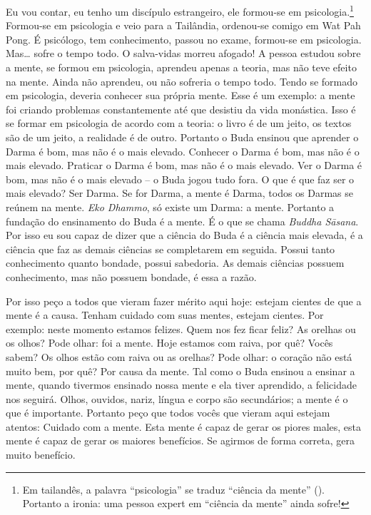 Eu vou contar, eu tenho um discípulo estrangeiro, ele formou-se em
psicologia.\footnote{Em tailandês, a palavra “psicologia” se traduz
“ciência da mente”
(). Portanto a
ironia: uma pessoa expert em “ciência da mente” ainda sofre!}
Formou-se em psicologia e veio para a Tailândia, ordenou-se comigo em
Wat Pah Pong. É psicólogo, tem conhecimento, passou no exame, formou-se
em psicologia. Mas\ldots{} sofre o tempo todo. O salva-vidas morreu afogado! A
pessoa estudou sobre a mente, se formou em psicologia, aprendeu apenas
a teoria, mas não teve efeito na mente. Ainda não aprendeu, ou não
sofreria o tempo todo. Tendo se formado em psicologia, deveria conhecer
sua própria mente. Esse é um exemplo: a mente foi criando problemas
constantemente até que desistiu da vida monástica. Isso é se formar em
psicologia de acordo com a teoria: o livro é de um jeito, os textos são
de um jeito, a realidade é de outro. Portanto o Buda ensinou que
aprender o Darma é bom, mas não é o mais elevado. Conhecer o Darma é
bom, mas não é o mais elevado. Praticar o Darma é bom, mas não é o mais
elevado. Ver o Darma é bom, mas não é o mais elevado
– o Buda jogou tudo fora. O que é que faz ser o mais
elevado? Ser Darma. Se for Darma, a mente é Darma, todos os Darmas se
reúnem na mente. \textit{Eko Dhammo}, só existe um Darma: a mente.
Portanto a fundação do ensinamento do Buda é a mente. É o que se chama
\textit{Buddha Sāsana}. Por isso eu sou capaz de dizer que a ciência
do Buda é a ciência mais elevada, é a ciência que faz as demais
ciências se completarem em seguida. Possui tanto conhecimento quanto
bondade, possui sabedoria. As demais ciências possuem conhecimento, mas
não possuem bondade, é essa a razão. 

Por isso peço a todos que vieram fazer mérito aqui hoje: estejam
cientes de que a mente é a causa. Tenham cuidado com suas mentes,
estejam cientes. Por exemplo: neste momento estamos felizes. Quem nos
fez ficar feliz? As orelhas ou os olhos? Pode olhar: foi a mente. Hoje
estamos com raiva, por quê? Vocês sabem? Os olhos estão com raiva ou as
orelhas? Pode olhar: o coração não está muito bem, por quê? Por causa
da mente. Tal como o Buda ensinou a ensinar a mente, quando tivermos
ensinado nossa mente e ela tiver aprendido, a felicidade nos seguirá.
Olhos, ouvidos, nariz, língua e corpo são secundários; a mente é o que
é importante. Portanto peço que todos vocês que vieram aqui estejam
atentos: Cuidado com a mente. Esta mente é capaz de gerar os piores
males, esta mente é capaz de gerar os maiores benefícios. Se agirmos de
forma correta, gera muito benefício. 

